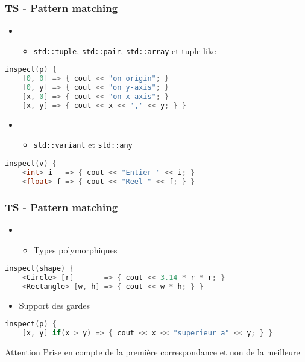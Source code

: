\documentclass[C++.tex]{subfiles}
\begin{document}
\begin{frame}[fragile]
	\frametitle{TS - Pattern matching}
	\begin{itemize}
		\item[] 
		\begin{itemize}
			\item \lstinline|std::tuple|, \lstinline|std::pair|, \lstinline|std::array| et tuple-like
		\end{itemize}
	\end{itemize}

	\begin{lstlisting}[language=C++]
inspect(p) {
	[0, 0] => { cout << "on origin"; }
	[0, y] => { cout << "on y-axis"; }
	[x, 0] => { cout << "on x-axis"; }
	[x, y] => { cout << x << ',' << y; } }\end{lstlisting}

	\begin{itemize}
		\item [] 
		\begin{itemize}
			\item \lstinline|std::variant| et \lstinline|std::any|
		\end{itemize}
	\end{itemize}

	\begin{lstlisting}[language=C++]
inspect(v) {
	<int> i   => { cout << "Entier " << i; }
	<float> f => { cout << "Reel " << f; } }\end{lstlisting}
\end{frame}

\begin{frame}[fragile]
	\frametitle{TS - Pattern matching}
	\begin{itemize}
		\item[] 
		\begin{itemize}
			\item Types polymorphiques
		\end{itemize}
	\end{itemize}

	\begin{lstlisting}[language=C++]
inspect(shape) {
	<Circle> [r]       => { cout << 3.14 * r * r; }
	<Rectangle> [w, h] => { cout << w * h; } }\end{lstlisting}

	\begin{itemize}
		\item Support des gardes
	\end{itemize}

	\begin{lstlisting}[language=C++]
inspect(p) {
	[x, y] if(x > y) => { cout << x << "superieur a" << y; } }\end{lstlisting}

	\begin{alertblock}{Attention}
		Prise en compte de la première correspondance et non de la meilleure
	\end{alertblock}
\end{frame}
\end{document}
